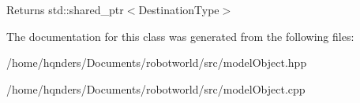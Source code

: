 \begin{DoxyReturn}{Returns}
std\+::shared\+\_\+ptr$<$\+Destination\+Type$>$ 
\end{DoxyReturn}


The documentation for this class was generated from the following files\+:\begin{DoxyCompactItemize}
\item 
/home/hqnders/\+Documents/robotworld/src/model\+Object.\+hpp\item
/home/hqnders/\+Documents/robotworld/src/model\+Object.\+cpp\end{DoxyCompactItemize}
